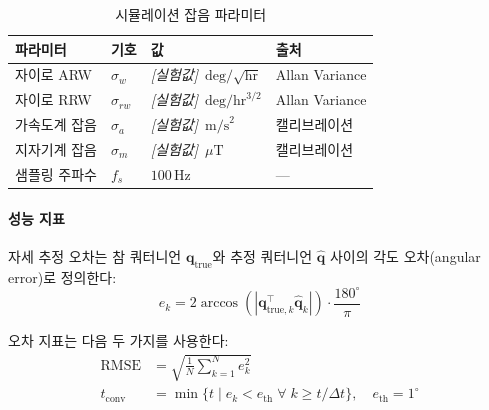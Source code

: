                 \begin{table}[H]
                    \centering
                    \caption{시뮬레이션 잡음 파라미터}
                    \label{tab:sim_params}
                    \begin{tabular}{llll}
                        \toprule
                        파라미터 & 기호 & 값 & 출처 \\
                        \midrule
                        자이로 ARW & $\sigma_w$ & \textit{[실험값]} $\,\text{deg}/\sqrt{\text{hr}}$ & Allan Variance \\
                        자이로 RRW & $\sigma_{rw}$ & \textit{[실험값]} $\,\text{deg}/\text{hr}^{3/2}$ & Allan Variance \\
                        가속도계 잡음 & $\sigma_a$ & \textit{[실험값]} $\,\text{m/s}^2$ & 캘리브레이션 \\
                        지자기계 잡음 & $\sigma_m$ & \textit{[실험값]} $\,\mu\text{T}$ & 캘리브레이션 \\
                        샘플링 주파수 & $f_s$ & $100\,\text{Hz}$ & --- \\
                        \bottomrule
                    \end{tabular}
                \end{table}

            \paragraph{성능 지표}
                자세 추정 오차는 참 쿼터니언 $\mathbf{q}_{\text{true}}$와 추정 쿼터니언 $\hat{\mathbf{q}}$ 사이의 각도 오차(angular error)로 정의한다:\\

                \begin{equation}
                    e_k = 2\arccos\!\left(\left|\mathbf{q}_{\text{true},k}^\top \hat{\mathbf{q}}_k\right|\right) \cdot \frac{180^\circ}{\pi}
                    \label{eq:angular_error}
                \end{equation}

                오차 지표는 다음 두 가지를 사용한다:\\

                \begin{align}
                    \text{RMSE} &= \sqrt{\frac{1}{N}\sum_{k=1}^N e_k^2} \label{eq:rmse} \\
                    t_{\text{conv}} &= \min\{t \mid e_k < e_{\text{th}}\;\forall\; k \geq t/\Delta t\}, \quad e_{\text{th}} = 1^\circ \label{eq:conv_time}
                \end{align}

